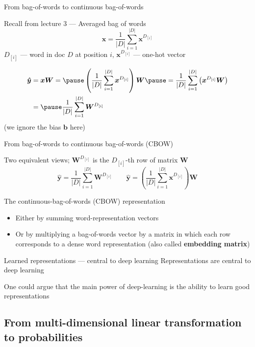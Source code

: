 \documentclass[12pt,aspectratio=169,handout]{beamer}
\begin{document}
\begin{frame}{From bag-of-words to continuous bag-of-words}
	\begin{block}{Recall from lecture 3 --- Averaged bag of words}
		$$\bm{x} = \frac{1}{|D|} \sum_{i =1}^{|D|} \bm{x}^{D_{[i]}}$$
		$D_{[i]}$ --- word in doc $D$ at position $i$, $\bm{x}^{D_{[i]}}$ --- one-hot vector
	\end{block}
	$$
	\begin{aligned}
		\bm{\hat{y}} &= \bm{x} \bm{W} = \pause
		\left (\frac{1}{|D|} \sum_{i =1}^{|D|} \bm{x}^{D_{[i]}} \right) \bm{W} 
		\pause = \frac{1}{|D|} \sum_{i =1}^{|D|} \left ( \bm{x}^{D_{[i]}} \bm{W} \right)  \\
		&= \pause \frac{1}{|D|} \sum_{i =1}^{|D|}  \bm{W}^{D_{[i]}} 
	\end{aligned}
	$$
	(we ignore the bias $\bm{b}$ here)
	
\end{frame}

\begin{frame}{From bag-of-words to continuous bag-of-words (CBOW)}
	\begin{block}{Two equivalent views; $\bm{W}^{D_{[i]}}$ is the $D_{[i]}$-th row of matrix $\bm{W}$}
		$$
		\bm{\hat{y}} = \frac{1}{|D|} \sum_{i =1}^{|D|} \bm{W}^{D_{[i]}}
		\qquad
		\bm{\hat{y}} = \left (\frac{1}{|D|} \sum_{i =1}^{|D|} \bm{x}^{D_{[i]}} \right) \bm{W} 
		$$
	\end{block}
	
	\pause
	The continuous-bag-of-words (CBOW) representation
	\begin{itemize}
		\item \pause Either by summing word-representation vectors
		\item \pause Or by multiplying a bag-of-words vector by a matrix in which each row corresponds to a dense word representation (also called \textbf{embedding matrix})
	\end{itemize}
	
\end{frame}

\begin{frame}{Learned representations --- central to deep learning}
	Representations are central to deep learning
	
	One could argue that the main power of deep-learning is the ability to learn good representations
\end{frame}


\subsection{From multi-dimensional linear transformation to probabilities}
\end{document}
